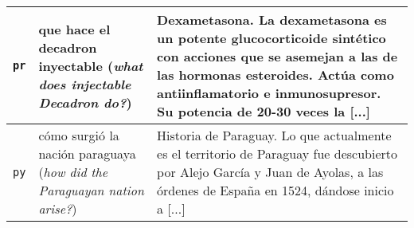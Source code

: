 \begin{tabularx}{\textwidth}{%
  >{\centering\arraybackslash}m{} 
  >{\centering\arraybackslash}m{} 
  >{\scriptsize\raggedright\arraybackslash}m{}
}
\midrule
\texttt{pr} & que hace el decadron inyectable (\emph{what does injectable Decadron do?}) & Dexametasona. La dexametasona es un potente glucocorticoide sintético con acciones que se asemejan a las de las hormonas esteroides. Actúa como antiinflamatorio e inmunosupresor. Su potencia de 20-30 veces la [...] \\ 
\midrule
\texttt{py} & cómo surgió la nación paraguaya (\emph{how did the Paraguayan nation arise?}) & Historia de Paraguay. Lo que actualmente es el territorio de Paraguay fue descubierto por Alejo García y Juan de Ayolas, a las órdenes de España en 1524, dándose inicio a [...] \\ 
\bottomrule

\end{tabularx}
